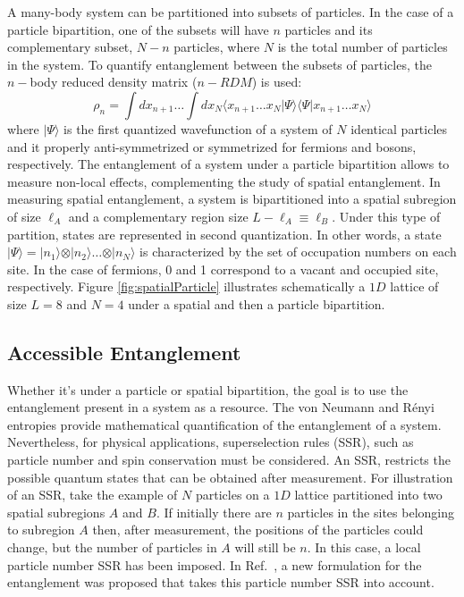 	
	A many-body system can be partitioned into subsets of particles. In the case of a particle bipartition, one of the subsets will have $n$ particles and its complementary subset, $N-n$ particles, where $N$ is the total number of particles in the system. To quantify entanglement between the subsets of particles, the $n-$body reduced density matrix ($n-RDM$) is used:
	\begin{equation}
	\rho_{n} = \int dx_{n+1} \dots \int dx_N \langle x_{n+1} \dots x_N \vert\Psi\rangle \langle\Psi\vert x_{n+1} \dots x_N \rangle
	\label{eq:nBodyDensityMatrix}
	\end{equation}
	where $\vert\Psi\rangle$ is the first quantized wavefunction of a system of $N$ identical particles and it properly anti-symmetrized or symmetrized for fermions and bosons, respectively.  The entanglement of a system under a particle bipartition allows to measure non-local effects, complementing the study of spatial entanglement. 
	In measuring spatial entanglement, a system is bipartitioned into a spatial subregion of size $\ell_{A}$ and a complementary region size $L - \ell_A \equiv \ell_B$. Under this type of partition, states are represented in second quantization. In other words, a state $\vert\Psi\rangle = \vert n_1 \rangle \otimes \vert n_2 \rangle \dots \otimes \vert n_N \rangle$ is characterized by the set of occupation numbers on each site. In the case of fermions, 0 and 1 correspond to a vacant and occupied site, respectively.  Figure \ref{fig:spatialParticle} illustrates schematically a $1D$ lattice of size $L = 8$ and $N = 4$ under a spatial and then a particle bipartition.
	
	\subsection{Accessible Entanglement}
	Whether it's under a particle or spatial bipartition, the goal is to use the entanglement present in a system as a resource. The von Neumann and R\'enyi entropies provide mathematical quantification of the entanglement of a system. Nevertheless, for physical applications, superselection rules (SSR), such as particle number and spin conservation must be considered.  An SSR, restricts the possible quantum states that can be obtained after measurement. For illustration of an SSR, take the example of $N$ particles on a $1D$ lattice partitioned into two spatial subregions $A$ and $B$. If initially there are $n$ particles in the sites belonging to subregion $A$ then, after measurement, the positions of the particles could change, but the number of particles in $A$ will still be $n$. In this case, a local particle number SSR has been imposed. In Ref.~\cite{Wiseman:2003jx}, a new formulation for the entanglement was proposed that takes this particle number SSR into account.
	

